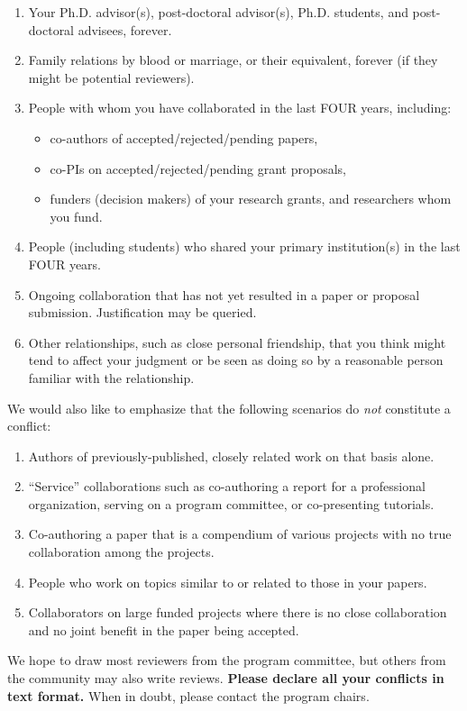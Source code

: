 \documentclass{sig-alternate}
\begin{document}
\begin{enumerate}
\item Your Ph.D. advisor(s), post-doctoral advisor(s), Ph.D. students,
      and post-doctoral advisees, forever.
\item Family relations by blood or marriage, or their equivalent,
      forever (if they might be potential reviewers).
\item People with whom you have collaborated in the last FOUR years, including:
  \begin{itemize}
  \item co-authors of accepted/rejected/pending papers,
  \item co-PIs on accepted/rejected/pending grant proposals,
  \item funders (decision makers) of your research grants, and researchers
      whom you fund.
  \end{itemize}
\item People (including students) who shared your primary institution(s) in the
last FOUR years.
\item Ongoing collaboration that has not yet resulted in a paper or proposal submission. Justification may be queried.
\item Other relationships, such as close personal friendship, that you think might tend
to affect your judgment or be seen as doing so by a reasonable person familiar
with the relationship.
\end{enumerate}

We would also like to emphasize that the following scenarios do {\em not} constitute a conflict:
\begin{enumerate}
\item Authors of previously-published, closely related work on that basis alone.
\item ``Service'' collaborations such as co-authoring a report for a professional organization, serving on a program committee, or co-presenting tutorials.
\item Co-authoring a paper that is a compendium of various projects with no true collaboration among the projects.
\item People who work on topics similar to or related to those in your papers.
\item Collaborators on large funded projects where there is no close collaboration and no joint benefit in the paper being accepted.
\end{enumerate}

We hope to draw most reviewers from the program committee, but others from the community may also write reviews. {\bf Please declare all your conflicts in text format.} When in doubt, please contact the program chairs.
\end{document}
